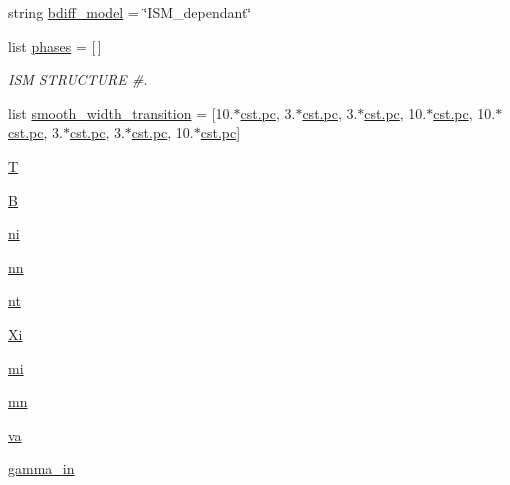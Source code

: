 \begin{DoxyCompactItemize}
\item 
string \hyperlink{namespacenamelist__uniform_a7b9bf9d4ef60bf8a3e3d9872c1229e10}{bdiff\+\_\+model} = \char`\"{}I\+S\+M\+\_\+dependant\char`\"{}
\item 
list \hyperlink{namespacenamelist__uniform_af1285b6f4d49dc05ff5114a84c87ea03}{phases} = \mbox{[}$\,$\mbox{]}
\begin{DoxyCompactList}\small\item\em I\+SM S\+T\+R\+U\+C\+T\+U\+RE \#. \end{DoxyCompactList}\item 
list \hyperlink{namespacenamelist__uniform_a04941e0b287d9299562191015a5d566c}{smooth\+\_\+width\+\_\+transition} = \mbox{[}10.$\ast$\hyperlink{constants_8h_a2884cd030c4c825754349a525a1d06ce}{cst.\+pc}, 3.$\ast$\hyperlink{constants_8h_a2884cd030c4c825754349a525a1d06ce}{cst.\+pc}, 3.$\ast$\hyperlink{constants_8h_a2884cd030c4c825754349a525a1d06ce}{cst.\+pc}, 10.$\ast$\hyperlink{constants_8h_a2884cd030c4c825754349a525a1d06ce}{cst.\+pc}, 10.$\ast$\hyperlink{constants_8h_a2884cd030c4c825754349a525a1d06ce}{cst.\+pc}, 3.$\ast$\hyperlink{constants_8h_a2884cd030c4c825754349a525a1d06ce}{cst.\+pc}, 3.$\ast$\hyperlink{constants_8h_a2884cd030c4c825754349a525a1d06ce}{cst.\+pc}, 10.$\ast$\hyperlink{constants_8h_a2884cd030c4c825754349a525a1d06ce}{cst.\+pc}\mbox{]}
\item 
\hyperlink{namespacenamelist__uniform_a6a573063926a6f17cbb2b3a31c43d4b9}{T}
\item 
\hyperlink{namespacenamelist__uniform_ae1690f9a9b42d7e25dcaf55bc0cf3740}{B}
\item 
\hyperlink{namespacenamelist__uniform_abee7e57b358b8573c75388c12f8861de}{ni}
\item 
\hyperlink{namespacenamelist__uniform_ac96703fb06a806a505e4c0806c6c0b90}{nn}
\item 
\hyperlink{namespacenamelist__uniform_a198cbd74a3e91796f8f3cbd9fdb199f1}{nt}
\item 
\hyperlink{namespacenamelist__uniform_a48241844a7bc005dc5c89b8d45c53246}{Xi}
\item 
\hyperlink{namespacenamelist__uniform_a7972f9ba50f29023481fb7b0f3f10646}{mi}
\item 
\hyperlink{namespacenamelist__uniform_a5fe816528182a7927c9158e29b3378eb}{mn}
\item 
\hyperlink{namespacenamelist__uniform_a2da183365c60c169afce9cf3b47d7d9b}{va}
\item 
\hyperlink{namespacenamelist__uniform_a425da3c0d76b3fa25d85e1160319346f}{gamma\+\_\+in}

\end{DoxyCompactItemize}
